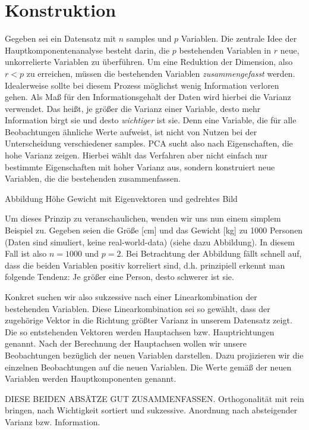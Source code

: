 \section{Konstruktion}

Gegeben sei ein Datensatz mit $n$ samples und $p$ Variablen. Die zentrale Idee der Hauptkomponentenanalyse besteht darin, die $p$ bestehenden Variablen in $r$ neue, unkorrelierte Variablen zu überführen. Um eine Reduktion der Dimension, also $r < p$ zu erreichen, müssen die bestehenden Variablen \textit{zusammengefasst} werden. Idealerweise sollte bei diesem Prozess möglichst wenig Information verloren gehen. Als Maß für den Informationsgehalt der Daten wird hierbei die Varianz verwendet. Das heißt, je größer die Varianz einer Variable, desto mehr Information birgt sie und desto \textit{wichtiger} ist sie. Denn eine Variable, die für alle Beobachtungen ähnliche Werte aufweist, ist nicht von Nutzen bei der Unterscheidung verschiedener samples. PCA sucht also nach Eigenschaften, die hohe Varianz zeigen. Hierbei wählt das Verfahren aber nicht einfach nur bestimmte Eigenschaften mit hoher Varianz aus, sondern konstruiert neue Variablen, die die bestehenden zusammenfassen.

Abbildung Höhe Gewicht mit Eigenvektoren und gedrehtes Bild

Um dieses Prinzip zu veranschaulichen, wenden wir uns nun einem simplem Beispiel zu. Gegeben seien die Größe [cm] und das Gewicht [kg] zu 1000 Personen (Daten sind simuliert, keine real-world-data) (siehe dazu Abbildung). In diesem Fall ist also $n = 1000$ und $p = 2$. Bei Betrachtung der Abbildung fällt schnell auf, dass die beiden Variablen positiv korreliert sind, d.h. prinzipiell erkennt man folgende Tendenz: Je größer eine Person, desto schwerer ist sie. 

Konkret suchen wir also sukzessive nach einer Linearkombination der bestehenden Variablen. Diese Linearkombination sei so gewählt, dass der zugehörige Vektor in die Richtung größter Varianz in unserem Datensatz zeigt. Die so entstehenden Vektoren werden Hauptachsen bzw. Hauptrichtungen genannt. Nach der Berechnung der Hauptachsen wollen wir unsere Beobachtungen bezüglich der neuen Variablen darstellen. Dazu projizieren wir die einzelnen Beobachtungen auf die neuen Variablen. Die Werte gemäß der neuen Variablen werden Hauptkomponenten genannt. 

DIESE BEIDEN ABSÄTZE GUT ZUSAMMENFASSEN. Orthogonalität mit rein bringen, nach Wichtigkeit sortiert und sukzessive.  Anordnung nach absteigender Varianz bzw. Information.


